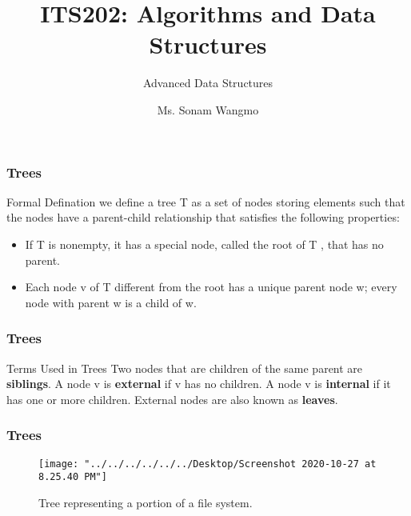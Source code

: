 \documentclass[11pt]{beamer}
\begin{document}
	\author{Ms. Sonam Wangmo}
	\title{ITS202: Algorithms and Data Structures}
	\subtitle{Advanced Data Structures}
	\institute{
		\textcolor{blue}{Gyalpozhing College of Information Technology \\ Royal University of Bhutan} \\
		\vspace{0.5cm}
	}
	\begin{frame}[plain]
		\maketitle
	\end{frame}
	\begin{frame}
		\frametitle{Trees}
		\begin{block}{Formal Defination}
			we define a tree T as a set of nodes storing elements such that the nodes have a parent-child relationship that satisfies the following properties:
			\begin{itemize}
				\item If T is nonempty, it has a special node, called the root of T , that has no parent. 
				\item Each node v of T different from the root has a unique parent node w; every node with parent w is a child of w.
			\end{itemize}
		\end{block}	
	\end{frame}

		\begin{frame}
		\frametitle{Trees}
		\begin{block}{Terms Used in Trees}
			Two nodes that are children of the same parent are \textbf{siblings}. A node v is \textbf{external} if v has no children. A node v is \textbf{internal} if it has one or more children. External nodes are also known as \textbf{leaves}.\\	
		\end{block}
	\end{frame}

	\begin{frame}	
		\frametitle{Trees}
		\begin{figure}
			\centering
			\texttt{[image: "../../../../../../Desktop/Screenshot 2020-10-27 at 8.25.40 PM"]}
			\caption{Tree representing a portion of a file system.}
			\label{fig:screenshot-2020-10-27-at-8}
		\end{figure}	
	\end{frame}
\end{document}
